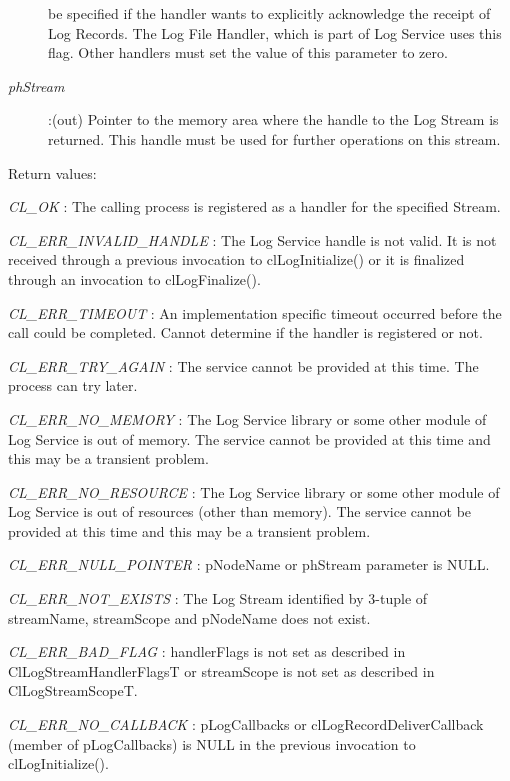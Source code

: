 \begin{flushleft}
\begin{Desc}
\begin{description}
be specified if the handler wants to explicitly acknowledge the receipt of Log Records. The Log File Handler, which is part of Log Service
uses this flag. Other handlers must set the value of this parameter to zero.
\item[{\em *phStream}]:(out) Pointer to the memory area where the handle to the Log Stream is returned. This handle must be used for further operations 
on this stream.
\end{description}
\end{Desc}
\begin{Desc}
\item[Return values:]
\item[{\em CL\_\-OK}]: The calling process is registered as a handler for the specified Stream.
\item[{\em CL\_\-ERR\_\-INVALID\_\-HANDLE}]: The Log Service handle is not valid. It is not received through a previous invocation to
clLogInitialize() or it is finalized through an invocation to clLogFinalize().
\item[{\em CL\_\-ERR\_\-TIMEOUT}]: An implementation specific timeout occurred before the call could be completed. Cannot determine if 
the handler is registered or not.
\item[{\em CL\_\-ERR\_\-TRY\_\-AGAIN}]: The service cannot be provided at this time. The process can try later.
\item[{\em CL\_\-ERR\_\-NO\_\-MEMORY}]: The Log Service library or some other module of Log Service is out of memory. The service cannot 
be provided at this time and this may be a transient problem.
\item[{\em CL\_\-ERR\_\-NO\_\-RESOURCE}]: The Log Service library or some other module of Log Service is out of resources 
(other than memory). The service cannot be provided at this time and this may be a transient problem.
\item[{\em CL\_\-ERR\_\-NULL\_\-POINTER}]: pNodeName or phStream parameter is NULL.
\item[{\em CL\_\-ERR\_\-NOT\_\-EXISTS}]: The Log Stream identified by 3-tuple of streamName, streamScope and pNodeName does not exist.
\item[{\em CL\_\-ERR\_\-BAD\_\-FLAG}]: handlerFlags is not set as described in ClLogStreamHandlerFlagsT or streamScope is not set as described 
in ClLogStreamScopeT.
\item[{\em CL\_\-ERR\_\-NO\_\-CALLBACK}]: pLogCallbacks or clLogRecordDeliverCallback (member of pLogCallbacks) is NULL in the 
previous invocation to clLogInitialize().

\end{Desc}
\end{flushleft}
